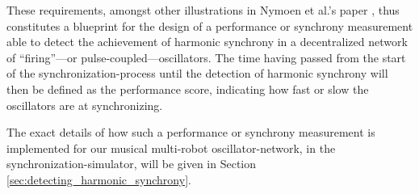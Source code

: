 	These requirements, amongst other illustrations in Nymoen et al.'s paper \cite{nymoen_synch}, thus constitutes a blueprint for the design of a performance or synchrony measurement able to detect the achievement of harmonic synchrony in a decentralized network of ``firing''—or pulse-coupled—oscillators. The time having passed from the start of the synchronization-process until the detection of harmonic synchrony will then be defined as the performance score, indicating how fast or slow the oscillators are at synchronizing.
	
	The exact details of how such a performance or synchrony measurement is implemented for our musical multi-robot oscillator-network, in the synchronization-simulator, will be given in Section \ref{sec:detecting_harmonic_synchrony}.


















	